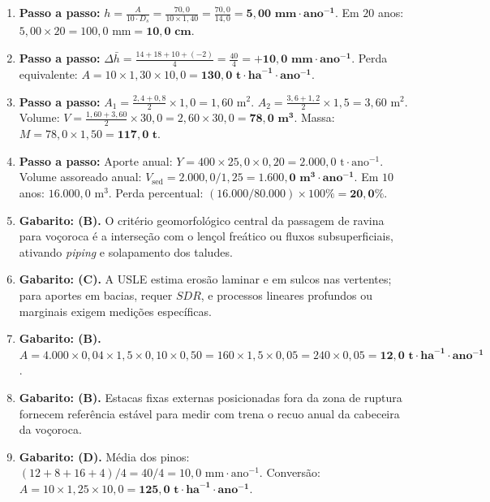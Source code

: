 \begin{boxGabarito}
\begin{enumerate}[leftmargin=1.6em, itemsep=4pt]
  Em contorno ($C = 0{,}20$, $P = 0{,}50$): $A_2 = 250{,}0 \times 0{,}20 \times 0{,}50 = \mathbf{25{,}0\text{ t}\cdot\text{ha}^{-1}\cdot\text{ano}^{-1}}$.
  \item \textbf{Passo a passo:}
  $h = \frac{A}{10 \cdot D_s} = \frac{70{,}0}{10 \times 1{,}40} = \frac{70{,}0}{14{,}0} = \mathbf{5{,}00\text{ mm}\cdot\text{ano}^{-1}}$.
  Em $20$ anos: $5{,}00 \times 20 = 100{,}0\text{ mm} = \mathbf{10{,}0\text{ cm}}$.
  \item \textbf{Passo a passo:}
  $\Delta \bar{h} = \frac{14 + 18 + 10 + (-2)}{4} = \frac{40}{4} = \mathbf{+10{,}0\text{ mm}\cdot\text{ano}^{-1}}$.
  Perda equivalente: $A = 10 \times 1{,}30 \times 10{,}0 = \mathbf{130{,}0\text{ t}\cdot\text{ha}^{-1}\cdot\text{ano}^{-1}}$.
  \item \textbf{Passo a passo:}
  $A_1 = \frac{2{,}4 + 0{,}8}{2}\times 1{,}0 = 1{,}60\text{ m}^2$.
  $A_2 = \frac{3{,}6 + 1{,}2}{2}\times 1{,}5 = 3{,}60\text{ m}^2$.
  Volume: $V = \frac{1{,}60 + 3{,}60}{2}\times 30{,}0 = 2{,}60 \times 30{,}0 = \mathbf{78{,}0\text{ m}^3}$.
  Massa: $M = 78{,}0 \times 1{,}50 = \mathbf{117{,}0\text{ t}}$.
  \item \textbf{Passo a passo:}
  Aporte anual: $Y = 400 \times 25{,}0 \times 0{,}20 = 2.000{,}0\text{ t}\cdot\text{ano}^{-1}$.
  Volume assoreado anual: $V_{\text{sed}} = 2.000{,}0 / 1{,}25 = \mathbf{1.600{,}0\text{ m}^3\cdot\text{ano}^{-1}}$.
  Em $10$ anos: $16.000{,}0\text{ m}^3$. Perda percentual: $(16.000 / 80.000)\times 100\% = \mathbf{20{,}0\%}$.
  \item \textbf{Gabarito: (B).} O critério geomorfológico central da passagem de ravina para voçoroca é a interseção com o lençol freático ou fluxos subsuperficiais, ativando \textit{piping} e solapamento dos taludes.
  \item \textbf{Gabarito: (C).} A USLE estima erosão laminar e em sulcos nas vertentes; para aportes em bacias, requer $SDR$, e processos lineares profundos ou marginais exigem medições específicas.
  \item \textbf{Gabarito: (B).} $A = 4.000 \times 0{,}04 \times 1{,}5 \times 0{,}10 \times 0{,}50 = 160 \times 1{,}5 \times 0{,}05 = 240 \times 0{,}05 = \mathbf{12{,}0\text{ t}\cdot\text{ha}^{-1}\cdot\text{ano}^{-1}}$.
  \item \textbf{Gabarito: (B).} Estacas fixas externas posicionadas fora da zona de ruptura fornecem referência estável para medir com trena o recuo anual da cabeceira da voçoroca.
  \item \textbf{Gabarito: (D).} Média dos pinos: $(12 + 8 + 16 + 4)/4 = 40/4 = 10{,}0\text{ mm}\cdot\text{ano}^{-1}$. Conversão: $A = 10 \times 1{,}25 \times 10{,}0 = \mathbf{125{,}0\text{ t}\cdot\text{ha}^{-1}\cdot\text{ano}^{-1}}$.
\end{enumerate}
\end{boxGabarito}

